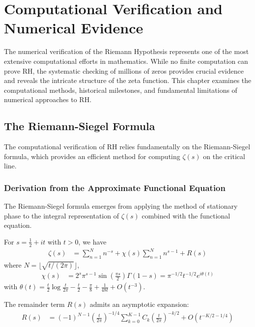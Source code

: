 \chapter{Computational Verification and Numerical Evidence}
\label{ch:computational}

The numerical verification of the Riemann Hypothesis represents one of the most extensive computational efforts in mathematics. While no finite computation can prove RH, the systematic checking of millions of zeros provides crucial evidence and reveals the intricate structure of the zeta function. This chapter examines the computational methods, historical milestones, and fundamental limitations of numerical approaches to RH.

\section{The Riemann-Siegel Formula}
\label{sec:riemann-siegel}

The computational verification of RH relies fundamentally on the Riemann-Siegel formula, which provides an efficient method for computing $\zeta(s)$ on the critical line.

\subsection{Derivation from the Approximate Functional Equation}

The Riemann-Siegel formula emerges from applying the method of stationary phase to the integral representation of $\zeta(s)$ combined with the functional equation.

\begin{theorem}
For $s = \frac{1}{2} + it$ with $t > 0$, we have
\begin{align}
\zeta(s) &= \sum_{n=1}^{N} n^{-s} + \chi(s) \sum_{n=1}^{N} n^{s-1} + R(s)
\end{align}
where $N = \lfloor\sqrt{t/(2\pi)}\rfloor$, 
\begin{align}
\chi(s) &= 2^s \pi^{s-1} \sin\left(\frac{\pi s}{2}\right) \Gamma(1-s) = \pi^{-1/2} t^{-1/2} e^{i\theta(t)}
\end{align}
with $\theta(t) = \frac{t}{2}\log\frac{t}{2\pi} - \frac{t}{2} - \frac{\pi}{8} + \frac{1}{48t} + O(t^{-3})$.
\end{theorem}

The remainder term $R(s)$ admits an asymptotic expansion:
\begin{align}
R(s) &= (-1)^{N-1} \left(\frac{t}{2\pi}\right)^{-1/4} \sum_{k=0}^{K-1} C_k \left(\frac{t}{2\pi}\right)^{-k/2} + O(t^{-K/2-1/4})
\end{align}

